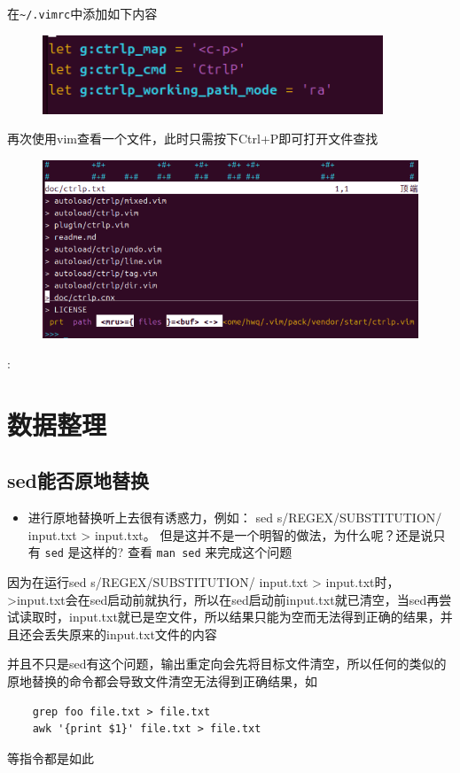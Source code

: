 \documentclass[a4paper, 12pt]{article}
\begin{document}
在\verb|~/.vimrc|中添加如下内容
\begin{figure}[H]
    \centering
    \includegraphics[width=1\linewidth]{vim3.png}
\end{figure}
再次使用vim查看一个文件，此时只需按下Ctrl+P即可打开文件查找
\begin{figure}[H]
    \centering
    \includegraphics[width=1\linewidth]{vim5.png}
\end{figure}:
\section{数据整理}
\subsection{sed能否原地替换}
\begin{itemize}
    \item 进行原地替换听上去很有诱惑力，例如：
sed s/REGEX/SUBSTITUTION/ input.txt > input.txt。
但是这并不是一个明智的做法，为什么呢？还是说只有 \verb|sed| 是这样的?
查看 \verb|man sed| 来完成这个问题 

\end{itemize}
因为在运行sed s/REGEX/SUBSTITUTION/ input.txt > input.txt时，>input.txt会在sed启动前就执行，所以在sed启动前input.txt就已清空，当sed再尝试读取时，input.txt就已是空文件，所以结果只能为空而无法得到正确的结果，并且还会丢失原来的input.txt文件的内容\par
并且不只是sed有这个问题，输出重定向会先将目标文件清空，所以任何的类似的原地替换的命令都会导致文件清空无法得到正确结果，如
\begin{verbatim}
    grep foo file.txt > file.txt  
    awk '{print $1}' file.txt > file.txt

\end{verbatim}
等指令都是如此
\end{document}
